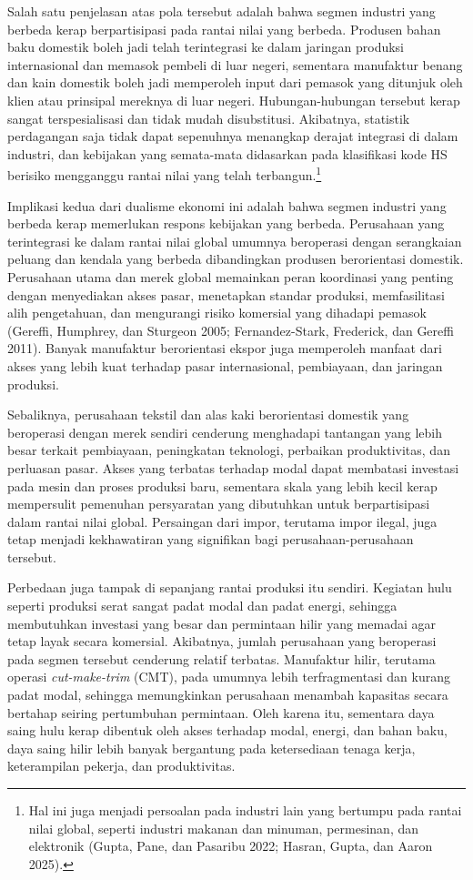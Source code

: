 \documentclass[
  manuscript=article,
  layout=publish,
  year=2026,
  volume=1,
]{den}
\begin{document}
Salah satu penjelasan atas pola tersebut adalah bahwa segmen industri
yang berbeda kerap berpartisipasi pada rantai nilai yang berbeda.
Produsen bahan baku domestik boleh jadi telah terintegrasi ke dalam
jaringan produksi internasional dan memasok pembeli di luar negeri,
sementara manufaktur benang dan kain domestik boleh jadi memperoleh
input dari pemasok yang ditunjuk oleh klien atau prinsipal mereknya di
luar negeri. Hubungan-hubungan tersebut kerap sangat terspesialisasi dan
tidak mudah disubstitusi. Akibatnya, statistik perdagangan saja tidak
dapat sepenuhnya menangkap derajat integrasi di dalam industri, dan
kebijakan yang semata-mata didasarkan pada klasifikasi kode HS berisiko
mengganggu rantai nilai yang telah terbangun.\footnote{Hal ini juga
  menjadi persoalan pada industri lain yang bertumpu pada rantai nilai
  global, seperti industri makanan dan minuman, permesinan, dan
  elektronik (Gupta, Pane, dan Pasaribu 2022; Hasran, Gupta, dan Aaron
  2025).}

Implikasi kedua dari dualisme ekonomi ini adalah bahwa segmen industri
yang berbeda kerap memerlukan respons kebijakan yang berbeda. Perusahaan
yang terintegrasi ke dalam rantai nilai global umumnya beroperasi dengan
serangkaian peluang dan kendala yang berbeda dibandingkan produsen
berorientasi domestik. Perusahaan utama dan merek global memainkan peran
koordinasi yang penting dengan menyediakan akses pasar, menetapkan
standar produksi, memfasilitasi alih pengetahuan, dan mengurangi risiko
komersial yang dihadapi pemasok (Gereffi, Humphrey, dan Sturgeon 2005;
Fernandez-Stark, Frederick, dan Gereffi 2011). Banyak manufaktur
berorientasi ekspor juga memperoleh manfaat dari akses yang lebih kuat
terhadap pasar internasional, pembiayaan, dan jaringan produksi.

Sebaliknya, perusahaan tekstil dan alas kaki berorientasi domestik yang
beroperasi dengan merek sendiri cenderung menghadapi tantangan yang
lebih besar terkait pembiayaan, peningkatan teknologi, perbaikan
produktivitas, dan perluasan pasar. Akses yang terbatas terhadap modal
dapat membatasi investasi pada mesin dan proses produksi baru, sementara
skala yang lebih kecil kerap mempersulit pemenuhan persyaratan yang
dibutuhkan untuk berpartisipasi dalam rantai nilai global. Persaingan
dari impor, terutama impor ilegal, juga tetap menjadi kekhawatiran yang
signifikan bagi perusahaan-perusahaan tersebut.

Perbedaan juga tampak di sepanjang rantai produksi itu sendiri. Kegiatan
hulu seperti produksi serat sangat padat modal dan padat energi,
sehingga membutuhkan investasi yang besar dan permintaan hilir yang
memadai agar tetap layak secara komersial. Akibatnya, jumlah perusahaan
yang beroperasi pada segmen tersebut cenderung relatif terbatas.
Manufaktur hilir, terutama operasi \emph{cut-make-trim} (CMT), pada
umumnya lebih terfragmentasi dan kurang padat modal, sehingga
memungkinkan perusahaan menambah kapasitas secara bertahap seiring
pertumbuhan permintaan. Oleh karena itu, sementara daya saing hulu kerap
dibentuk oleh akses terhadap modal, energi, dan bahan baku, daya saing
hilir lebih banyak bergantung pada ketersediaan tenaga kerja,
keterampilan pekerja, dan produktivitas.
\end{document}
